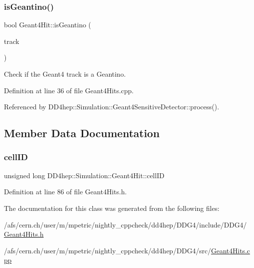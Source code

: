 \subsubsection{\texorpdfstring{is\+Geantino()}{isGeantino()}}
{\footnotesize\ttfamily bool Geant4\+Hit\+::is\+Geantino (\begin{DoxyParamCaption}\item[{G4\+Track $\ast$}]{track }\end{DoxyParamCaption})\hspace{0.3cm}{\ttfamily [static]}}



Check if the Geant4 track is a Geantino. 



Definition at line 36 of file Geant4\+Hits.\+cpp.



Referenced by D\+D4hep\+::\+Simulation\+::\+Geant4\+Sensitive\+Detector\+::process().



\subsection{Member Data Documentation}
\hypertarget{class_d_d4hep_1_1_simulation_1_1_geant4_hit_a4ad2477cc6b2280300970d709190174d}{}\label{class_d_d4hep_1_1_simulation_1_1_geant4_hit_a4ad2477cc6b2280300970d709190174d} 
\subsubsection{\texorpdfstring{cell\+ID}{cellID}}
{\footnotesize\ttfamily unsigned long D\+D4hep\+::\+Simulation\+::\+Geant4\+Hit\+::cell\+ID}



Definition at line 86 of file Geant4\+Hits.\+h.



The documentation for this class was generated from the following files\+:\begin{DoxyCompactItemize}
\item 
/afs/cern.\+ch/user/m/mpetric/nightly\+\_\+cppcheck/dd4hep/\+D\+D\+G4/include/\+D\+D\+G4/\hyperlink{_geant4_hits_8h}{Geant4\+Hits.\+h}\item 
/afs/cern.\+ch/user/m/mpetric/nightly\+\_\+cppcheck/dd4hep/\+D\+D\+G4/src/\hyperlink{_geant4_hits_8cpp}{Geant4\+Hits.\+cpp}\end{DoxyCompactItemize}
